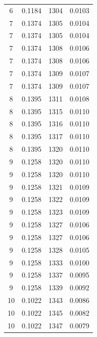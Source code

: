 \documentclass[%
 reprint,
nofootinbib,
 amsmath,amssymb,
 aps,
floatfix,
]{revtex4-2}
\begin{document}
\begin{table}[]
\begin{tabular}{@{}cccc@{}}
        6         & 0.1184  & 1304               & 0.0103   \\
        7         & 0.1374  & 1305               & 0.0104   \\
        7         & 0.1374  & 1305               & 0.0104   \\
        7         & 0.1374  & 1308               & 0.0106   \\
        7         & 0.1374  & 1308               & 0.0106   \\
        7         & 0.1374  & 1309               & 0.0107   \\
        7         & 0.1374  & 1309               & 0.0107   \\
        8         & 0.1395  & 1311               & 0.0108   \\
        8         & 0.1395  & 1315               & 0.0110   \\
        8         & 0.1395  & 1316               & 0.0110   \\
        8         & 0.1395  & 1317               & 0.0110   \\
        8         & 0.1395  & 1320               & 0.0110   \\
        9         & 0.1258  & 1320               & 0.0110   \\
        9         & 0.1258  & 1320               & 0.0110   \\
        9         & 0.1258  & 1321               & 0.0109   \\
        9         & 0.1258  & 1322               & 0.0109   \\
        9         & 0.1258  & 1323               & 0.0109   \\
        9         & 0.1258  & 1327               & 0.0106   \\
        9         & 0.1258  & 1327               & 0.0106   \\
        9         & 0.1258  & 1328               & 0.0105   \\
        9         & 0.1258  & 1333               & 0.0100   \\
        9         & 0.1258  & 1337               & 0.0095   \\
        9         & 0.1258  & 1339               & 0.0092   \\
        10        & 0.1022  & 1343               & 0.0086   \\
        10        & 0.1022  & 1345               & 0.0082   \\
        10        & 0.1022  & 1347               & 0.0079   \\

\end{tabular}
\end{table}
\end{document}
